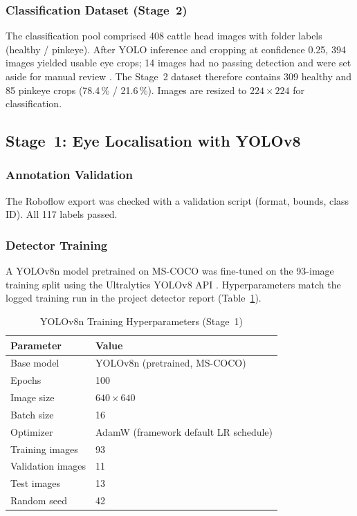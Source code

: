 \documentclass[10pt,journal,compsoc]{IEEEtran}
\begin{document}
\subsubsection{Classification Dataset (Stage~2)}
The classification pool comprised 408 cattle head images with folder
labels (healthy / pinkeye). After YOLO inference and cropping at
confidence 0.25, 394 images yielded usable eye crops; 14 images had no
passing detection and were set aside for manual review
\cite{advisor_summary}. The Stage~2 dataset therefore contains 309 healthy
and 85 pinkeye crops (78.4\,\% / 21.6\,\%). Images are resized to
$224 \times 224$ for classification.

\subsection{Stage~1: Eye Localisation with YOLOv8}
\label{subsec:stage1}

\subsubsection{Annotation Validation}
The Roboflow export was checked with a validation script (format,
bounds, class ID). All 117 labels passed.

\subsubsection{Detector Training}
A YOLOv8n model pretrained on MS-COCO was fine-tuned on the 93-image
training split using the Ultralytics YOLOv8 API \cite{ultralytics2023yolov8}.
Hyperparameters match the logged training run in the project detector
report (Table~\ref{tab:yolo_config}).

\begin{table}[h]
  \caption{YOLOv8n Training Hyperparameters (Stage~1)}
  \label{tab:yolo_config}
  \centering
  \begin{tabular}{ll}
    \toprule
    \textbf{Parameter} & \textbf{Value} \\
    \midrule
    Base model        & YOLOv8n (pretrained, MS-COCO) \\
    Epochs            & 100 \\
    Image size        & $640 \times 640$ \\
    Batch size        & 16 \\
    Optimizer         & AdamW (framework default LR schedule) \\
    Training images   & 93 \\
    Validation images & 11 \\
    Test images       & 13 \\
    Random seed       & 42 \\
    \bottomrule
  \end{tabular}
\end{table}
\end{document}
